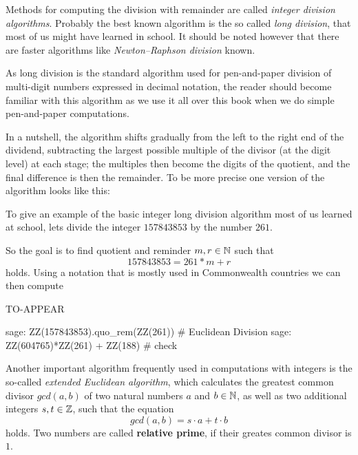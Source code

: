 Methods for computing the division with remainder are called \textit{integer division algorithms}. Probably the best known algorithm is the so called \textit{long division}, that most of us might have learned in school. It should be noted however that there are faster algorithms like \textit{Newton–Raphson division} known.

As long division is the standard algorithm used for pen-and-paper division of multi-digit numbers expressed in decimal notation, the reader should become familiar with this algorithm as we use it all over this book when we do simple pen-and-paper computations.

In a nutshell, the algorithm shifts gradually from the left to the right end of the dividend, subtracting the largest possible multiple of the divisor (at the digit level) at each stage; the multiples then become the digits of the quotient, and the final difference is then the remainder. To be more precise one version of the algorithm looks like this:


\begin{example} To give an example of the basic integer long division algorithm most of us learned at school, lets divide the integer $157843853$ by the number $261$. 

So the goal is to find quotient and reminder $m,r \in \mathbb{N}$ such that
$$157843853 = 261 * m +r$$
holds. Using a notation that is mostly used in Commonwealth countries we can then compute

TO-APPEAR 
\end{example}

\begin{sagecommandline}
sage: ZZ(157843853).quo_rem(ZZ(261)) # Euclidean Division
sage: ZZ(604765)*ZZ(261) + ZZ(188) # check
\end{sagecommandline}


Another important algorithm frequently used in computations with integers is the so-called \textit{extended Euclidean algorithm}, which calculates the greatest common divisor $ gcd (a, b) $ of two natural numbers $ a $ and $ b \in \mathbb{N} $, as well as two additional integers $ s, t \in \mathbb{Z} $, such that the equation
\begin{equation}
\label{eq: erw_Eukl_algo}
gcd (a, b) = s \cdot a + t \cdot b
\end{equation}
holds. Two numbers are called \textbf{relative prime}, if their greates common divisor is $1$.

